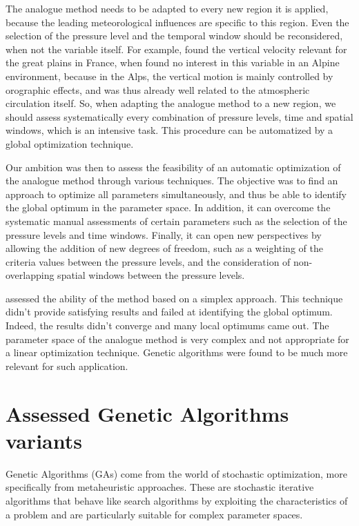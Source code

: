 \documentclass[twocol]{ametsoc}
\begin{document}
The analogue method needs to be adapted to every new region it is applied, because the leading meteorological influences are specific to this region. Even the selection of the pressure level and the temporal window should be reconsidered, when not the variable itself. For example, \citet{BenDaoud2010} found the vertical velocity relevant for the great plains in France, when \citet{Horton2012a} found no interest in this variable in an Alpine environment, because in the Alps, the vertical motion is mainly controlled by orographic effects, and was thus already well related to the atmospheric circulation itself. So, when adapting the analogue method to a new region, we should assess systematically every combination of pressure levels, time and spatial windows, which is an intensive task. This procedure can be automatized by a global optimization technique.

Our ambition was then to assess the feasibility of an automatic optimization of the analogue method through various techniques. The objective was to find an approach to optimize all parameters simultaneously, and thus be able to identify the global optimum in the parameter space. In addition, it can overcome the systematic manual assessments of certain parameters such as the selection of the pressure levels and time windows. Finally, it can open new perspectives by allowing the addition of new degrees of freedom, such as a weighting of the criteria values between the pressure levels, and the consideration of non-overlapping spatial windows between the pressure levels.

\citet{Horton2012a} assessed the ability of the \citet{Nelder1965a} method based on a simplex approach. This technique didn't provide satisfying results and failed at identifying the global optimum. Indeed, the results didn't converge and many local optimums came out. The parameter space of the analogue method is very complex and not appropriate for a linear optimization technique. Genetic algorithms were found to be much more relevant for such application.


\section{Assessed Genetic Algorithms variants}
\label{sec:gas}

Genetic Algorithms (GAs) come from the world of stochastic optimization, more specifically from metaheuristic approaches. These are stochastic iterative algorithms that behave like search algorithms by exploiting the characteristics of a problem and are particularly suitable for complex parameter spaces.
\end{document}
